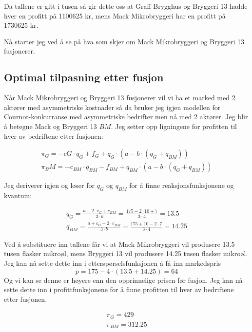 \documentclass[
  12pt,
  a4paper,
  DIV=11,
  numbers=noendperiod]{scrartcl}
\begin{document}
Da tallene er gitt i tusen så gir dette oss at Graff Brygghus og
Bryggeri 13 hadde hver en profitt på 1100625 kr, mens Mack Mikrobryggeri
har en profitt på 1730625 kr.

Nå starter jeg ved å se på hva som skjer om Mack Mikrobryggeri og
Bryggeri 13 fusjonerer.

\clearpage

\subsection{Optimal tilpasning etter
fusjon}\label{optimal-tilpasning-etter-fusjon}

Når Mack Mikrobryggeri og Bryggeri 13 fusjonerer vil vi ha et marked med
2 aktører med asymmetriske kostnader så da bruker jeg igjen modellen for
Cournot-konkurranse med asymmetriske bedrifter men nå med 2 aktører. Jeg
blir å betegne Mack og Bryggeri 13 \(BM\). Jeg setter opp ligningene for
profitten til hver av bedriftene etter fusjonen:

\begin{align*}
\pi_G = -cG \cdot q_G + f_G + q_G \cdot (a - b \cdot (q_G + q_{BM}))\\
\pi_BM = -c_{BM} \cdot q_{BM} - f_{BM} + q_{BM} \cdot (a - b \cdot (q_G + q_{BM}))
\end{align*}

Jeg deriverer igjen og løser for \(q_G\) og \(q_{BM}\) for å finne
reaksjonsfunksjonene og kvantum:

\begin{align*}
q_G = \frac{a-2\cdot c_G + c_{BM}}{3\cdot b} = \frac{175-2\cdot 10 + 7}{3\cdot 4} =  13.5\\
q_{BM} = \frac{a + c_G -2\cdot c_{BM}}{3\cdot b} = \frac{175 + 10 -2\cdot 7}{3\cdot 4} = 14.25
\end{align*}

Ved å substituere inn tallene får vi at Mack Mikrobryggeri vil produsere
13.5 tusen flasker mikroøl, mens Bryggeri 13 vil produsere 14.25 tusen
flasker mikroøl. Jeg kan nå sette dette inn i etterspørselsfunksjonen å
få inn markedspris \[
p = 175 - 4 \cdot (13.5 + 14.25) = 64
\] Og vi kan se denne er høyere enn den opprinnelige prisen før fusjon.
Jeg kan nå sette dette inn i profittfunksjonene for å finne profitten
til hver av bedriftene etter fusjonen.

\begin{align*}
\pi_G = 429 \\
\pi_{BM} = 312.25
\end{align*}
\end{document}
